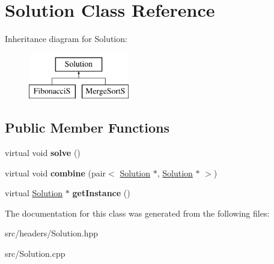 \hypertarget{classSolution}{\section{Solution Class Reference}
\label{classSolution}
}
Inheritance diagram for Solution\-:\begin{figure}[H]
\begin{center}
\leavevmode
\includegraphics[height=2.000000cm]{classSolution}
\end{center}
\end{figure}
\subsection*{Public Member Functions}
\begin{DoxyCompactItemize}
\item 
\hypertarget{classSolution_ab69c19a449ed2f7289c8c0b4d8690d1d}{virtual void {\bfseries solve} ()}\label{classSolution_ab69c19a449ed2f7289c8c0b4d8690d1d}

\item 
\hypertarget{classSolution_add7d3c93aa7c6dd9e7e2def61d706ec9}{virtual void {\bfseries combine} (pair$<$ \hyperlink{classSolution}{Solution} $\ast$, \hyperlink{classSolution}{Solution} $\ast$ $>$)}\label{classSolution_add7d3c93aa7c6dd9e7e2def61d706ec9}

\item 
\hypertarget{classSolution_a654dea68c595ae8065a6b563865c23c6}{virtual \hyperlink{classSolution}{Solution} $\ast$ {\bfseries get\-Instance} ()}\label{classSolution_a654dea68c595ae8065a6b563865c23c6}

\end{DoxyCompactItemize}


The documentation for this class was generated from the following files\-:\begin{DoxyCompactItemize}
\item 
src/headers/Solution.\-hpp\item 
src/Solution.\-cpp\end{DoxyCompactItemize}
